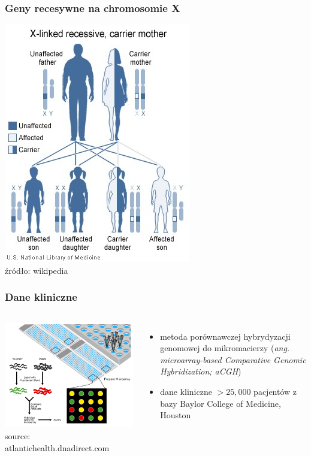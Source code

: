 \documentclass[table]{beamer}
\begin{document}
\begin{frame}\frametitle{Geny recesywne na chromosomie X}
	    \begin{center}
	   \includegraphics[width=0.5 \textwidth]{new-images/XlinkRecessive.jpg}\\
	   \tiny{źródło: wikipedia}  
	    \end{center}
\end{frame}

\begin{frame}\frametitle{Dane kliniczne}
 \begin{columns}   
	    \begin{center}
	   \includegraphics[width=\textwidth]{new-images/hybridization.png}\\
	   \tiny{source: atlantichealth.dnadirect.com}  
	    \end{center}
  \begin{itemize}
  \item metoda porównawczej hybrydyzacji genomowej do mikromacierzy ({\em ang. microarray-based Comparative
Genomic Hybridization; aCGH})
  \item dane kliniczne $> 25,000$ pacjentów z bazy Baylor College of Medicine, Houston
 \end{itemize}
\end{columns}
   
\end{frame}
\end{document}
